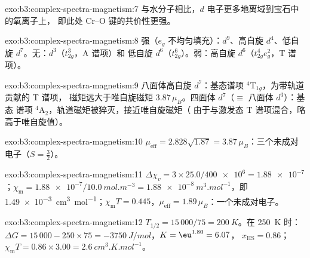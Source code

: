 \begin{solution}{exo:b3:complex-spectra-magnetism:7}
与水分子相比，$d$ 电子更多地离域到宝石中的氧离子上，
即此处 Cr--O 键的共价性更强。
\end{solution}

\begin{solution}{exo:b3:complex-spectra-magnetism:8}
强（$e_g$ 不均匀填充）：$d^9$、高自旋 $d^4$、低自旋 $d^7$。无：$d^3$（$t_{2g}^3$，A 谱项）和
低自旋 $d^6$（$t_{2g}^6$）。弱：高自旋 $d^6$（$t_{2g}^4e_g^2$，T 谱项）。
\end{solution}

\begin{solution}{exo:b3:complex-spectra-magnetism:9}
八面体高自旋 $d^7$：基态谱项 $^4$T$_{1g}$，为带轨道贡献的 T 谱项，
磁矩远大于唯自旋磁矩 $3.87\,\mu_B$。四面体 $d^7$（$\equiv$ 八面体 $d^3$）：基态
谱项 $^4$A$_2$，轨道磁矩被猝灭，接近唯自旋磁矩（
由于与激发态 T 谱项混合，略高于唯自旋值）。
\end{solution}

\begin{solution}{exo:b3:complex-spectra-magnetism:10}
$\mu_{\mathrm{eff}} = 2.828\sqrt{1.87} = 3.87\,\mu_B$：三个未成对电子（$S = \frac32$）。
\end{solution}

\begin{solution}{exo:b3:complex-spectra-magnetism:11}
$\Delta\chi_v = 3 \times 25.0/\num{400e6} = \num{1.88e-7}$；$\chi_{\mathrm m} = \num{1.88e-7}/\qty{10.0}{mol.m^{-3}} = \qty{1.88e-8}{m^3.mol^{-1}}$，即
\qty{1.49e-3}{cm^3.mol^{-1}}；$\chi_{\mathrm m}T = 0.445$，$\mu_{\mathrm{eff}} = 1.89\,\mu_B$：一个未成对电子。
\end{solution}

\begin{solution}{exo:b3:complex-spectra-magnetism:12}
$T_{1/2} = 15\,000/75 = \qty{200}{K}$。在 \qty{250}{K} 时：$\Delta G = 15\,000 - 250 \times 75 = \qty{-3750}{J/mol}$，$K = \eu^{1.80} = 6.07$，
$x_{\mathrm{HS}} = 0.86$；$\chi_{\mathrm m}T = 0.86 \times 3.00 = \qty{2.6}{cm^3.K.mol^{-1}}$。
\end{solution}

